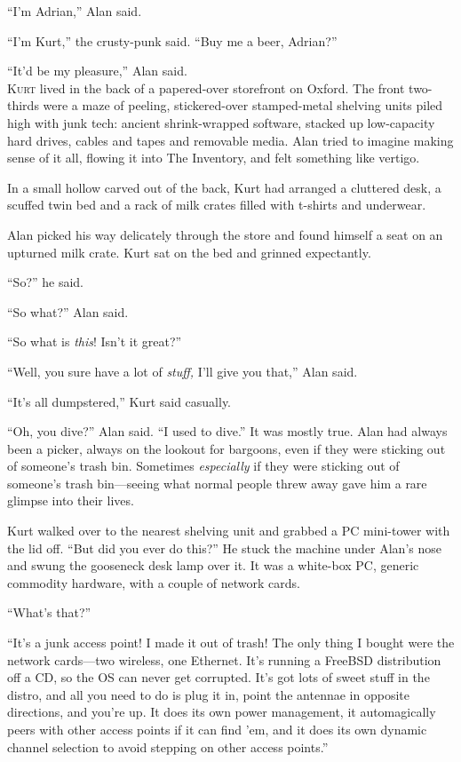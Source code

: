 \documentclass{article}
\begin{document}
``I'm Adrian,'' Alan said.

``I'm Kurt,'' the crusty-punk said.  ``Buy me a beer, Adrian?''

``It'd be my pleasure,'' Alan said.
\\
\lettrine[lines=3, lhang=.5, nindent=0pt, findent=2pt]{K}{urt} lived in the back of a papered-over storefront on Oxford.  The
front two-thirds were a maze of peeling, stickered-over stamped-metal
shelving units piled high with junk tech:  ancient shrink-wrapped
software, stacked up low-capacity hard drives, cables and tapes and
removable media.  Alan tried to imagine making sense of it all,
flowing it into The Inventory, and felt something like vertigo.

In a small hollow carved out of the back, Kurt had arranged a
cluttered desk, a scuffed twin bed and a rack of milk crates filled
with t-shirts and underwear.

Alan picked his way delicately through the store and found himself a
seat on an upturned milk crate.  Kurt sat on the bed and grinned
expectantly.

``So?'' he said.

``So what?'' Alan said.

``So what is \textit{this}!  Isn't it great?''

``Well, you sure have a lot of \textit{stuff,} I'll give you that,''
Alan said.

``It's all dumpstered,'' Kurt said casually.

``Oh, you dive?'' Alan said.  ``I used to dive.'' It was mostly true. 
Alan had always been a picker, always on the lookout for bargoons,
even if they were sticking out of someone's trash bin.  Sometimes
\textit{especially} if they were sticking out of someone's trash
bin---seeing what normal people threw away gave him a rare glimpse
into their lives.

Kurt walked over to the nearest shelving unit and grabbed a PC
mini-tower with the lid off.  ``But did you ever do this?'' He stuck
the machine under Alan's nose and swung the gooseneck desk lamp over
it.  It was a white-box PC, generic commodity hardware, with a couple
of network cards.

``What's that?''

``It's a junk access point!  I made it out of trash!  The only thing I
bought were the network cards---two wireless, one Ethernet.  It's
running a FreeBSD distribution off a CD, so the OS can never get
corrupted.  It's got lots of sweet stuff in the distro, and all you
need to do is plug it in, point the antennae in opposite directions,
and you're up.  It does its own power management, it automagically
peers with other access points if it can find 'em, and it does its own
dynamic channel selection to avoid stepping on other access points.''
\end{document}
